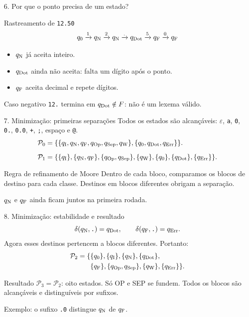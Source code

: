\documentclass[aspectratio=169,11pt]{beamer}
\begin{document}
\begin{frame}{6. Por que o ponto precisa de um estado?}
\begin{block}{Rastreamento de \texttt{12.50}}
\[
q_{\mathrm{0}}\xrightarrow{1}q_{\mathrm{N}}\xrightarrow{2}q_{\mathrm{N}}
\xrightarrow{.}q_{\mathrm{Dot}}\xrightarrow{5}q_{\mathrm{F}}\xrightarrow{0}q_{\mathrm{F}}
\]
\end{block}
\begin{itemize}
\item $q_{\mathrm{N}}$ já aceita inteiro.
\item $q_{\mathrm{Dot}}$ ainda não aceita: falta um dígito após o ponto.
\item $q_{\mathrm{F}}$ aceita decimal e repete dígitos.
\end{itemize}
\begin{alertblock}{Caso negativo}
\texttt{12.} termina em $q_{\mathrm{Dot}}\notin F$: não é um lexema válido.
\end{alertblock}
\end{frame}

\begin{frame}{7. Minimização: primeiras separações}
\small
Todos os estados são alcançáveis: $\varepsilon$, \texttt{a}, \texttt{0},
\texttt{0.}, \texttt{0.0}, \texttt{+}, \texttt{;}, espaço e \texttt{@}.
\begin{align*}
\mathcal{P}_0=\{&\{q_{\mathrm{I}},q_{\mathrm{N}},q_{\mathrm{F}},q_{\mathrm{Op}},q_{\mathrm{Sep}},q_{\mathrm{W}}\},
\{q_{\mathrm{0}},q_{\mathrm{Dot}},q_{\mathrm{Err}}\}\}.\\[2mm]
\mathcal{P}_1=\{&\{q_{\mathrm{I}}\},\{q_{\mathrm{N}},q_{\mathrm{F}}\},\{q_{\mathrm{Op}},q_{\mathrm{Sep}}\},
\{q_{\mathrm{W}}\},\{q_{\mathrm{0}}\},\{q_{\mathrm{Dot}}\},\{q_{\mathrm{Err}}\}\}.
\end{align*}
\begin{block}{Regra de refinamento de Moore}
Dentro de cada bloco, comparamos os blocos de destino para cada classe.
Destinos em blocos diferentes obrigam a separação.
\end{block}
$q_{\mathrm{N}}$ e $q_{\mathrm{F}}$ ainda ficam juntos na primeira rodada.
\end{frame}

\begin{frame}{8. Minimização: estabilidade e resultado}
\[
\delta(q_{\mathrm{N}},\texttt{.})=q_{\mathrm{Dot}},\qquad
\delta(q_{\mathrm{F}},\texttt{.})=q_{\mathrm{Err}}.
\]
Agora esses destinos pertencem a blocos diferentes. Portanto:
\begin{align*}
\mathcal{P}_2=\{&\{q_{\mathrm{0}}\},\{q_{\mathrm{I}}\},\{q_{\mathrm{N}}\},\{q_{\mathrm{Dot}}\},\\
&\{q_{\mathrm{F}}\},\{q_{\mathrm{Op}},q_{\mathrm{Sep}}\},\{q_{\mathrm{W}}\},\{q_{\mathrm{Err}}\}\}.
\end{align*}
\begin{block}{Resultado}
$\mathcal{P}_3=\mathcal{P}_2$: oito estados. Só OP e SEP se fundem.
Todos os blocos são alcançáveis e distinguíveis por sufixos.
\end{block}
Exemplo: o sufixo \texttt{.0} distingue $q_{\mathrm{N}}$ de $q_{\mathrm{F}}$.
\end{frame}
\end{document}
